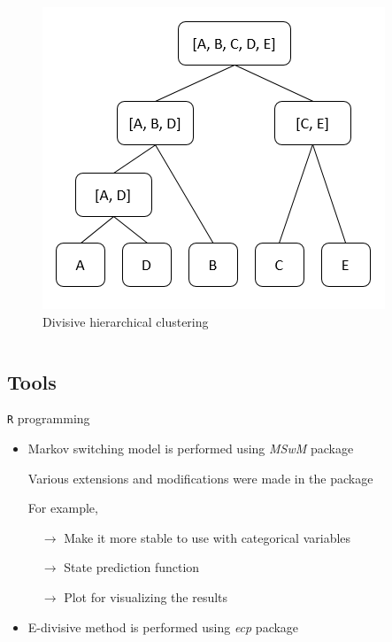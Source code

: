 \documentclass{beamer}
\begin{document}
\begin{frame}[fragile]
\begin{columns}[c]
	\begin{figure}
		\includegraphics[width=1\linewidth]{divisive}
		\caption{Divisive hierarchical clustering}
	\end{figure}
	
\end{columns}

\end{frame}
\subsection{Tools}
\begin{frame}
\texttt{R} programming

\begin{itemize}
	\item Markov switching model is performed using \textit{MSwM} package \cite{p2}
	
	Various extensions and modifications were made in the package
	
	For example, 
	
	$\quad \rightarrow$ Make it more stable to use with categorical variables
	
	$\quad \rightarrow$ State prediction function
	
	$\quad \rightarrow$ Plot for visualizing the results
	
	\item E-divisive method is performed using \textit{ecp} package \cite{p3}
\end{itemize}

\end{frame}
\end{document}
